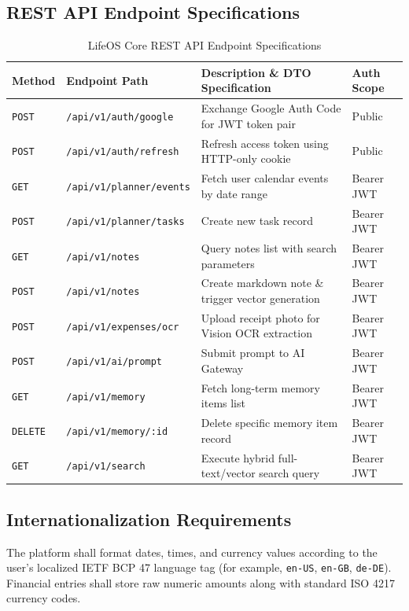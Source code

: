 \documentclass[11pt,a4paper]{article}
\begin{document}
\subsection{REST API Endpoint Specifications}
\begin{table}[h!]
\centering
\small
\begin{tabularx}{\textwidth}{|>{\raggedright\arraybackslash}p{1.8cm}|>{\raggedright\arraybackslash}p{4.8cm}|>{\raggedright\arraybackslash}X|>{\raggedright\arraybackslash}p{2.2cm}|}
\hline
\textbf{Method} & \textbf{Endpoint Path} & \textbf{Description \& DTO Specification} & \textbf{Auth Scope} \\ \hline
\texttt{POST} & \texttt{/api/v1/auth/google} & Exchange Google Auth Code for JWT token pair & Public \\ \hline
\texttt{POST} & \texttt{/api/v1/auth/refresh} & Refresh access token using HTTP-only cookie & Public \\ \hline
\texttt{GET} & \texttt{/api/v1/planner/events} & Fetch user calendar events by date range & Bearer JWT \\ \hline
\texttt{POST} & \texttt{/api/v1/planner/tasks} & Create new task record & Bearer JWT \\ \hline
\texttt{GET} & \texttt{/api/v1/notes} & Query notes list with search parameters & Bearer JWT \\ \hline
\texttt{POST} & \texttt{/api/v1/notes} & Create markdown note \& trigger vector generation & Bearer JWT \\ \hline
\texttt{POST} & \texttt{/api/v1/expenses/ocr} & Upload receipt photo for Vision OCR extraction & Bearer JWT \\ \hline
\texttt{POST} & \texttt{/api/v1/ai/prompt} & Submit prompt to AI Gateway & Bearer JWT \\ \hline
\texttt{GET} & \texttt{/api/v1/memory} & Fetch long-term memory items list & Bearer JWT \\ \hline
\texttt{DELETE} & \texttt{/api/v1/memory/:id} & Delete specific memory item record & Bearer JWT \\ \hline
\texttt{GET} & \texttt{/api/v1/search} & Execute hybrid full-text/vector search query & Bearer JWT \\ \hline
\end{tabularx}
\caption{LifeOS Core REST API Endpoint Specifications}
\end{table}

\subsection{Internationalization Requirements}
The platform shall format dates, times, and currency values according to the user's localized IETF BCP 47 language tag (for example, \texttt{en-US}, \texttt{en-GB}, \texttt{de-DE}). Financial entries shall store raw numeric amounts along with standard ISO 4217 currency codes.
\end{document}
